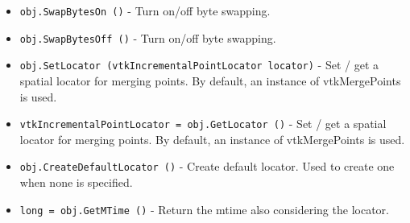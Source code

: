 \begin{itemize}
\item  \verb|obj.SwapBytesOn ()| -  Turn on/off byte swapping.

\item  \verb|obj.SwapBytesOff ()| -  Turn on/off byte swapping.

\item  \verb|obj.SetLocator (vtkIncrementalPointLocator locator)| -  Set / get a spatial locator for merging points. By default, 
 an instance of vtkMergePoints is used.

\item  \verb|vtkIncrementalPointLocator = obj.GetLocator ()| -  Set / get a spatial locator for merging points. By default, 
 an instance of vtkMergePoints is used.

\item  \verb|obj.CreateDefaultLocator ()| -  Create default locator. Used to create one when none is specified.

\item  \verb|long = obj.GetMTime ()| -  Return the mtime also considering the locator.

\end{itemize}

